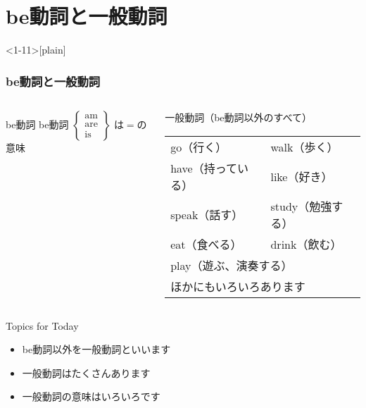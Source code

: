\documentclass[aspectratio=169]{beamer}
\begin{document}
\section{be動詞と一般動詞}
\begin{frame}<1-11>[plain]\frametitle{be動詞と一般動詞}

\begin{columns}
\begin{column}[t]{.38\textwidth}
\begin{block}{be動詞}
be動詞
{\footnotesize
$
 \left\{
\begin{array}{l}
\text{am}\\
\text{are}\\
\text{is}
\end{array}\right\}
$
}
は$=$の意味
\end{block}
\end{column}
\pause
\begin{column}[t]{.52\textwidth}
\begin{block}{一般動詞（be動詞以外のすべて）}
\begin{tabular}[t]{ll}
go（行く）&walk（歩く）\pause\\
have（持っている）&like（好き）\pause\\
speak（話す）&study（勉強する）\pause\\
eat（食べる）& drink（飲む）\pause\\
\multicolumn{2}{l}{play（遊ぶ、演奏する）\pause}\\
\multicolumn{2}{l}{ほかにもいろいろあります}\\
\end{tabular}

\end{block}
\end{column}
\end{columns}


\bigskip
\pause
\begin{exampleblock}{Topics for Today}
\begin{itemize}[<+- |alert@+>]
 \item  be動詞以外を一般動詞といいます
 \item 一般動詞はたくさんあります
 \item 一般動詞の意味はいろいろです
\end{itemize}
     \end{exampleblock}

\end{frame}
\end{document}
